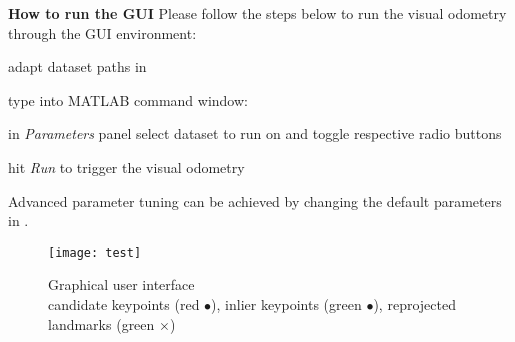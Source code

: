 \textbf{How to run the GUI}
Please follow the steps below to run the visual odometry through the GUI environment:
\begin{compactenum}
	\item adapt dataset paths in 
	\item type into MATLAB command window: 
	\item in \textit{Parameters} panel select dataset to run on and toggle respective radio buttons
	\item hit \textit{Run} to trigger the visual odometry\\
\end{compactenum}

Advanced parameter tuning can be achieved by changing the default parameters in .

\begin{figure}[ht]
	\centering
	\texttt{[image: test]}
	\captionsetup{justification=centering}
	\caption{Graphical user interface \\candidate keypoints (red $\bullet$), inlier keypoints (green $\bullet$), reprojected landmarks (green $\times$)}
	\label{img_gui}
\end{figure}


\clearpage{\pagestyle{plain}\cleardoublepage}

\clearpage{\pagestyle{plain}\cleardoublepage}